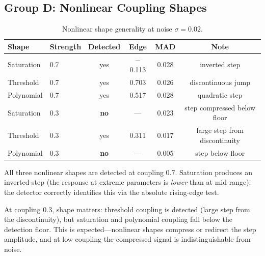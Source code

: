 \subsection{Group D: Nonlinear Coupling Shapes}

\begin{table}[h]
\centering
\caption{Nonlinear shape generality at noise $\sigma = 0.02$.}
\label{tab:nonlinear}
\begin{tabular}{llcccc}
  \toprule
  Shape & Strength & Detected & Edge & MAD & Note \\
  \midrule
  Saturation  & 0.7 & yes & $-$0.113 & 0.028 & inverted step \\
  Threshold   & 0.7 & yes & \phantom{$-$}0.703 & 0.026 & discontinuous jump \\
  Polynomial  & 0.7 & yes & \phantom{$-$}0.517 & 0.028 & quadratic step \\
  \midrule
  Saturation  & 0.3 & \textbf{no}  & --- & 0.023 & step compressed below floor \\
  Threshold   & 0.3 & yes & \phantom{$-$}0.311 & 0.017 & large step from discontinuity \\
  Polynomial  & 0.3 & \textbf{no}  & --- & 0.005 & step below floor \\
  \bottomrule
\end{tabular}
\end{table}

All three nonlinear shapes are detected at coupling $0.7$.
Saturation produces an inverted step (the response at extreme
parameters is \emph{lower} than at mid-range); the detector
correctly identifies this via the absolute rising-edge test.

At coupling $0.3$, shape matters: threshold coupling is detected
(large step from the discontinuity), but saturation and polynomial
coupling fall below the detection floor. This is expected---nonlinear
shapes compress or redirect the step amplitude, and at low coupling
the compressed signal is indistinguishable from noise.
